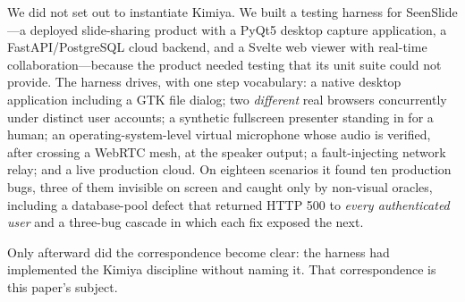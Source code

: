 \documentclass[acmsmall,screen,nonacm]{acmart}
\theoremstyle{acmdefinition}%
\theoremstyle{acmplain}%
\begin{document}
We did not set out to instantiate Kimiya. We built a testing harness for
SeenSlide---a deployed slide-sharing product with a PyQt5 desktop
capture application, a FastAPI/PostgreSQL cloud backend, and a Svelte
web viewer with real-time collaboration---because the product needed
testing that its unit suite could not provide. The harness drives, with
one step vocabulary: a native desktop application including a GTK file
dialog; two \emph{different} real browsers concurrently under distinct
user accounts; a synthetic fullscreen presenter standing in for a human;
an operating-system-level virtual microphone whose audio is verified,
after crossing a WebRTC mesh, at the speaker output; a fault-injecting
network relay; and a live production cloud. On eighteen scenarios it
found ten production bugs, three of them invisible on screen and caught
only by non-visual oracles, including a database-pool defect that
returned HTTP 500 to \emph{every authenticated user} and a three-bug
cascade in which each fix exposed the next.

Only afterward did the correspondence become clear: the harness had
implemented the Kimiya discipline without naming it. That correspondence
is this paper's subject.
\end{document}
